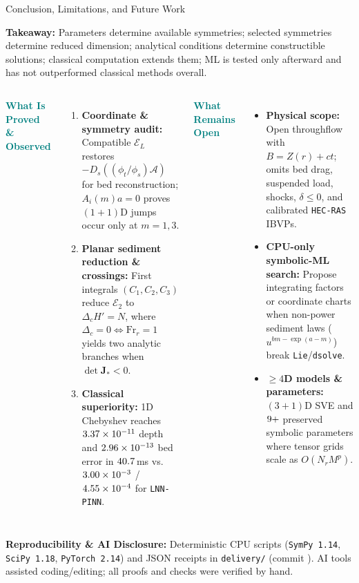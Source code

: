 \documentclass[aspectratio=169,11pt]{beamer}
\newcommand{\lead}[1]{\textcolor{teal}{\textbf{#1}}}
\newcommand{\smallnote}[1]{{\scriptsize\color{muted}#1\par}}
\newcommand{\divider}{\par\vspace{1.2mm}{\color{line}\rule{\linewidth}{.35pt}}\par\vspace{1.2mm}}
\DeclareRobustCommand{\code}[1]{\texttt{#1}}
\begin{document}
\begin{frame}[t]{Conclusion, Limitations, and Future Work}
\vspace{0.5mm}
\smallnote{\textbf{Takeaway:} Parameters determine available symmetries; selected symmetries determine reduced dimension; analytical conditions determine constructible solutions; classical computation extends them; ML is tested only afterward and has not outperformed classical methods overall.}
\vspace{1.2mm}
\begin{columns}[T,onlytextwidth]
\lead{What Is Proved \& Observed}\par
\footnotesize
\begin{enumerate}\setlength{\itemsep}{2.5pt}
 \item \textbf{Coordinate \& symmetry audit:} Compatible $\mathcal E_L$ restores $-D_s((\phi_t/\phi_s)\mathcal A)$ for bed reconstruction; $A_i(m)a=0$ proves $(1+1)$D jumps occur only at $m=1,3$.
 \item \textbf{Planar sediment reduction \& crossings:} First integrals $(C_1,C_2,C_3)$ reduce $\mathcal E_2$ to $\Delta_c H'=N$, where $\Delta_c=0\iff\mathrm{Fr}_r=1$ yields two analytic branches when $\det\mathbf J_*<0$.
 \item \textbf{Classical superiority:} 1D Chebyshev reaches $3.37\times 10^{-11}$ depth and $2.96\times 10^{-13}$ bed error in $40.7$\,ms vs.\ $3.00\times 10^{-3}$ / $4.55\times 10^{-4}$ for \texttt{LNN-PINN}.
\end{enumerate}

\lead{What Remains Open}\par
\footnotesize
\begin{itemize}\setlength{\itemsep}{2.5pt}
 \item \textbf{Physical scope:} Open throughflow with $B=Z(r)+ct$; omits bed drag, suspended load, shocks, $\delta\le0$, and calibrated \texttt{HEC-RAS} IBVPs.
 \item \textbf{CPU-only symbolic-ML search:} Propose integrating factors or coordinate charts when non-power sediment laws ($u^{bm-\exp(a-m)}$) break \texttt{Lie}/\texttt{dsolve}.
 \item \textbf{$\ge 4$D models \& parameters:} $(3+1)$D SVE and $9+$ preserved symbolic parameters where tensor grids scale as $O(N_r M^p)$.
\end{itemize}
\end{columns}
\divider
\smallnote{\textbf{Reproducibility \& AI Disclosure:} Deterministic CPU scripts (\code{SymPy 1.14}, \code{SciPy 1.18}, \code{PyTorch 2.14}) and JSON receipts in \code{delivery/} (commit \code{\NumGitCommitShort}). AI tools assisted coding/editing; all proofs and checks were verified by hand.}
\end{frame}
\end{document}
